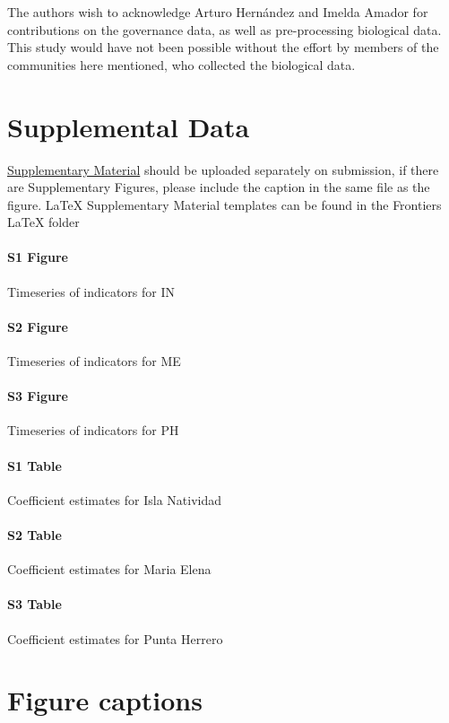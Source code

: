 \documentclass{frontiersSCNS}
\theoremstyle{definition}
\theoremstyle{definition}
\theoremstyle{definition}
\theoremstyle{remark}
\begin{document}
The authors wish to acknowledge Arturo Hernández and Imelda Amador for
contributions on the governance data, as well as pre-processing
biological data. This study would have not been possible without the
effort by members of the communities here mentioned, who collected the
biological data.

\section*{Supplemental Data}

\href{http://home.frontiersin.org/about/author-guidelines#SupplementaryMaterial}{Supplementary Material}
should be uploaded separately on submission, if there are Supplementary
Figures, please include the caption in the same file as the figure.
LaTeX Supplementary Material templates can be found in the Frontiers
LaTeX folder

\paragraph*{S1 Figure}
\label{S1_Figure}

Timeseries of indicators for IN

\paragraph*{S2 Figure}
\label{S2_Figure}

Timeseries of indicators for ME

\paragraph*{S3 Figure}
\label{S3_Figure}

Timeseries of indicators for PH

\paragraph*{S1 Table}
\label{S1_Table}

Coefficient estimates for Isla Natividad

\paragraph*{S2 Table}
\label{S2_Table}

Coefficient estimates for Maria Elena

\paragraph*{S3 Table}
\label{S3_Table}

Coefficient estimates for Punta Herrero



\section*{Figure captions}
\end{document}
